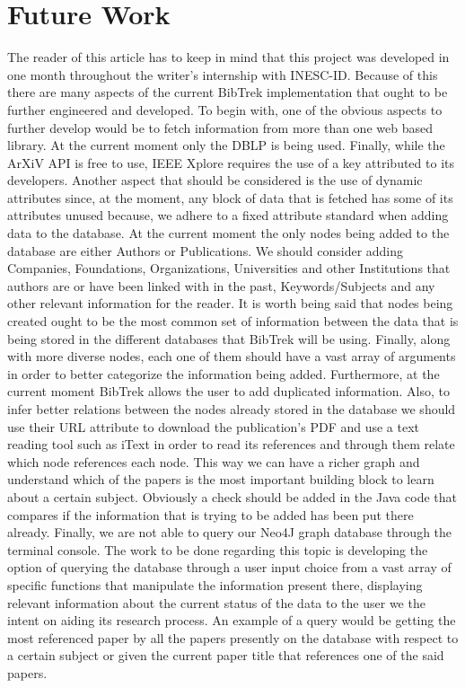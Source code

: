 \documentclass{article}
\begin{document}
\section{Future Work}
The reader of this article has to keep in mind that this project was developed in one month throughout the writer's internship with INESC-ID. Because of this there are many aspects of the current BibTrek implementation that ought to be further engineered and developed. To begin with, one of the obvious aspects to further develop would be to fetch information from more than one web based library. At the current moment only the DBLP is being used. Finally, while the ArXiV API is free to use, IEEE Xplore requires the use of a key attributed to its developers. Another aspect that should be considered is the use of dynamic attributes since, at the moment, any block of data that is fetched has some of its attributes unused because, we adhere to a fixed attribute standard when adding data to the database. At the current moment the only nodes being added to the database are either Authors or Publications. We should consider adding Companies, Foundations, Organizations, Universities and other Institutions that authors are or have been linked with in the past, Keywords/Subjects and any other relevant information for the reader. It is worth being said that nodes being created ought to be the most common set of information between the data that is being stored in the different databases that BibTrek will be using. Finally, along with more diverse nodes, each one of them should have a vast array of arguments in order to better categorize the information being added. Furthermore, at the current moment BibTrek allows the user to add duplicated information. Also, to infer better relations between the nodes already stored in the database we should use their URL attribute to download the publication's PDF and use a text reading tool such as iText in order to read its references and through them relate which node references each node. This way we can have a richer graph and understand which of the papers is the most important building block to learn about a certain subject. Obviously a check should be added in the Java code that compares if the information that is trying to be added has been put there already. Finally, we are not able to query our Neo4J graph database through the terminal console. The work to be done regarding this topic is developing the option of querying the database through a user input choice from a vast array of specific functions that manipulate the information present there, displaying relevant information about the current status of the data to the user we the intent on aiding its research process. An example of a query would be getting the most referenced paper by all the papers presently on the database with respect to a certain subject or given the current paper title that references one of the said papers.
\end{document}
